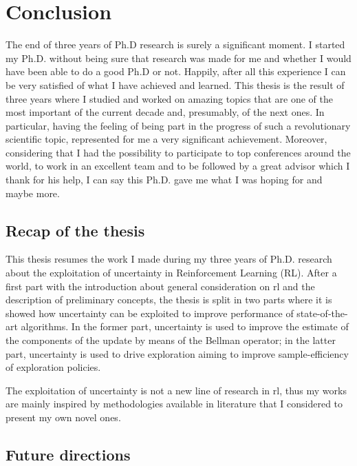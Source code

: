 \chapter{Conclusion}
The end of three years of Ph.D research is surely a significant moment. I started my Ph.D. without being sure that research was made for me and whether I would have been able to do a good Ph.D or not. Happily, after all this experience I can be very satisfied of what I have achieved and learned.
This thesis is the result of three years where I studied and worked on amazing topics that are one of the most important of the current decade and, presumably, of the next ones. In particular, having the feeling of being part in the progress of such a revolutionary scientific topic, represented for me a very significant achievement. Moreover, considering that I had the possibility to participate to top conferences around the world, to work in an excellent team and to be followed by a great advisor which I thank for his help, I can say this Ph.D. gave me what I was hoping for and maybe more.

\section{Recap of the thesis}
This thesis resumes the work I made during my three years of Ph.D. research about the exploitation of uncertainty in Reinforcement Learning (RL). After a first part with the introduction about general consideration on \gls{rl} and the description of preliminary concepts, the thesis is split in two parts where it is showed how uncertainty can be exploited to improve performance of state-of-the-art algorithms. In the former part, uncertainty is used to improve the estimate of the components of the update by means of the Bellman operator; in the latter part, uncertainty is used to drive exploration aiming to improve sample-efficiency of exploration policies.

The exploitation of uncertainty is not a new line of research in \gls{rl}, thus my works are mainly inspired by methodologies available in literature that I considered to present my own novel ones. 

\section{Future directions}
